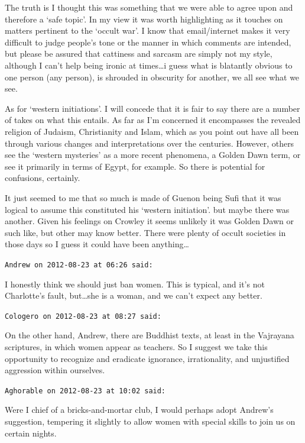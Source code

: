 \begin{footnotesize}
\begin{sffamily}
The truth is I thought this was something that we were able to agree upon and therefore a `safe topic'. In my view it was worth highlighting as it touches on matters pertinent to the `occult war'. I know that email/internet makes it very difficult to judge people's tone or the manner in which comments are intended, but please be assured that cattiness and sarcasm are simply not my style, although I can't help being ironic at times…i guess what is blatantly obvious to one person (any person), is shrouded in obscurity for another, we all see what we see.

As for `western initiations'. I will concede that it is fair to say there are a number of takes on what this entails. As far as I'm concerned it encompasses the revealed religion of Judaism, Christianity and Islam, which as you point out have all been through various changes and interpretations over the centuries. However, others see the `western mysteries' as a more recent phenomena, a Golden Dawn term, or see it primarily in terms of Egypt, for example. So there is potential for confusions, certainly.

It just seemed to me that so much is made of Guenon being Sufi that it was logical to assume this constituted his `western initiation'. but maybe there was another. Given his feelings on Crowley it seems unlikely it was Golden Dawn or such like, but other may know better. There were plenty of occult societies in those days so I guess it could have been anything…


\hfill

\texttt{Andrew on 2012-08-23 at 06:26 said: }

I honestly think we should just ban women. This is typical, and it's not Charlotte's fault, but…she is a woman, and we can't expect any better.


\hfill

\texttt{Cologero on 2012-08-23 at 08:27 said: }

On the other hand, Andrew, there are Buddhist texts, at least in the Vajrayana scriptures, in which women appear as teachers. So I suggest we take this opportunity to recognize and eradicate ignorance, irrationality, and unjustified aggression within ourselves.


\hfill

\texttt{Aghorable on 2012-08-23 at 10:02 said: }

Were I chief of a bricks-and-mortar club, I would perhaps adopt Andrew's suggestion, tempering it slightly to allow women with special skills to join us on certain nights.


\end{sffamily}
\end{footnotesize}
